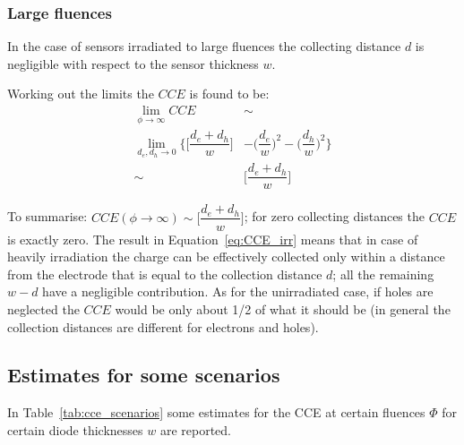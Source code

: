 \subsubsection{Large fluences}
In the case of sensors irradiated to large fluences  the 
collecting distance $d$ is negligible with respect to the sensor thickness $w$.

Working out the limits the $CCE$ is found to be:
\begin{equation}
\begin{split}
\lim_{\phi \to \infty}CCE & \sim \\ 
\lim_{d_e,d_h\to 0}  \Big\{\Big[\dfrac{d_e+d_h}{w}\Big]& - \Big(\dfrac{d_e}{w}\Big)^2 -\Big(\dfrac{d_h}{w}\Big)^2\Big\}\\
\sim & \Big[\dfrac{d_e+d_h}{w}\Big]
\end{split}
\label{eq:CCE_irr}
\end{equation}

To summarise: $CCE(\phi\to \infty)\sim\Big[\dfrac{d_e+d_h}{w}\Big]$; for zero 
collecting distances the $CCE$ is exactly zero. 
The result  in Equation~\ref{eq:CCE_irr} means that in case of heavily irradiation the charge 
can be effectively collected only within a distance from the electrode that is equal to the collection distance $d$; all the remaining $w-d$ have a negligible contribution. As for the unirradiated case, if holes are neglected the $CCE$ would be only about 1/2 of what it should be (in general
 the collection distances are different for electrons and holes).

\subsection{Estimates for some scenarios}

In Table~\ref{tab:cce_scenarios} some estimates for the CCE at certain fluences $\Phi$ for 
certain diode thicknesses $w$ are reported.

